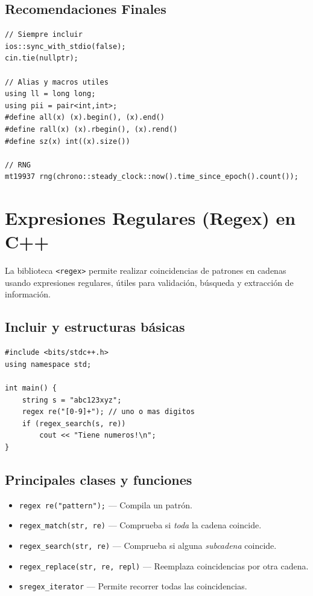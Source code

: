 \documentclass{article}
\begin{document}
\subsection{Recomendaciones Finales}

\begin{lstlisting}[style=cppstyle]
// Siempre incluir
ios::sync_with_stdio(false);
cin.tie(nullptr);

// Alias y macros utiles
using ll = long long;
using pii = pair<int,int>;
#define all(x) (x).begin(), (x).end()
#define rall(x) (x).rbegin(), (x).rend()
#define sz(x) int((x).size())

// RNG
mt19937 rng(chrono::steady_clock::now().time_since_epoch().count());
\end{lstlisting}

\section{Expresiones Regulares (Regex) en C++}

La biblioteca \lstinline|<regex>| permite realizar coincidencias de patrones en cadenas usando expresiones regulares, útiles para validación, búsqueda y extracción de información.

\subsection{Incluir y estructuras básicas}
\begin{lstlisting}[style=cppstyle]
#include <bits/stdc++.h>
using namespace std;

int main() {
    string s = "abc123xyz";
    regex re("[0-9]+"); // uno o mas digitos
    if (regex_search(s, re))
        cout << "Tiene numeros!\n";
}
\end{lstlisting}

\subsection{Principales clases y funciones}

\begin{itemize}
  \item \lstinline|regex re("pattern");| — Compila un patrón.
  \item \lstinline|regex_match(str, re)| — Comprueba si \emph{toda} la cadena coincide.
  \item \lstinline|regex_search(str, re)| — Comprueba si alguna \emph{subcadena} coincide.
  \item \lstinline|regex_replace(str, re, repl)| — Reemplaza coincidencias por otra cadena.
  \item \lstinline|sregex_iterator| — Permite recorrer todas las coincidencias.
\end{itemize}
\end{document}

